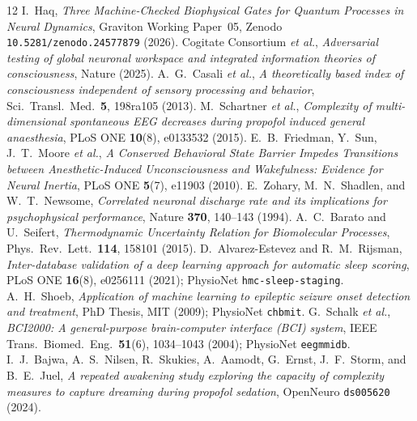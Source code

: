 \documentclass[11pt,letterpaper]{article}
\begin{document}
\clearpage
\begin{thebibliography}{12}
I.~Haq, \emph{Three Machine-Checked Biophysical Gates for Quantum Processes in Neural Dynamics}, Graviton Working Paper~05, Zenodo \texttt{10.5281/zenodo.24577879} (2026).
Cogitate Consortium \emph{et al.}, \emph{Adversarial testing of global neuronal workspace and integrated information theories of consciousness}, Nature (2025).
A.~G.~Casali \emph{et al.}, \emph{A theoretically based index of consciousness independent of sensory processing and behavior}, Sci.\ Transl.\ Med.\ \textbf{5}, 198ra105 (2013).
M.~Schartner \emph{et al.}, \emph{Complexity of multi-dimensional spontaneous EEG decreases during propofol induced general anaesthesia}, PLoS ONE \textbf{10}(8), e0133532 (2015).
E.~B.~Friedman, Y.~Sun, J.~T.~Moore \emph{et al.}, \emph{A Conserved Behavioral State Barrier Impedes Transitions between Anesthetic-Induced Unconsciousness and Wakefulness: Evidence for Neural Inertia}, PLoS ONE \textbf{5}(7), e11903 (2010).
E.~Zohary, M.~N.~Shadlen, and W.~T.~Newsome, \emph{Correlated neuronal discharge rate and its implications for psychophysical performance}, Nature \textbf{370}, 140--143 (1994).
A.~C.~Barato and U.~Seifert, \emph{Thermodynamic Uncertainty Relation for Biomolecular Processes}, Phys.\ Rev.\ Lett.\ \textbf{114}, 158101 (2015).
D.~Alvarez-Estevez and R.~M.~Rijsman, \emph{Inter-database validation of a deep learning approach for automatic sleep scoring}, PLoS ONE \textbf{16}(8), e0256111 (2021); PhysioNet \texttt{hmc-sleep-staging}.
A.~H.~Shoeb, \emph{Application of machine learning to epileptic seizure onset detection and treatment}, PhD Thesis, MIT (2009); PhysioNet \texttt{chbmit}.
G.~Schalk \emph{et al.}, \emph{BCI2000: A general-purpose brain-computer interface (BCI) system}, IEEE Trans.\ Biomed.\ Eng.\ \textbf{51}(6), 1034--1043 (2004); PhysioNet \texttt{eegmmidb}.
I.~J.~Bajwa, A.~S.~Nilsen, R.~Skukies, A.~Aamodt, G.~Ernst, J.~F.~Storm, and B.~E.~Juel, \emph{A repeated awakening study exploring the capacity of complexity measures to capture dreaming during propofol sedation}, OpenNeuro \texttt{ds005620} (2024).
\end{thebibliography}
\end{document}
